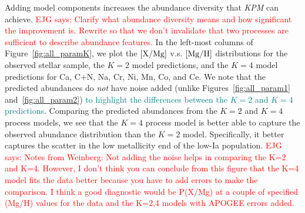 \documentclass[modern]{aastex631}
\newcommand{\xmg}{[{\rm X}/{\rm Mg}]}
\newcommand{\mgh}{[{\rm Mg}/{\rm H}]}
\newcommand{\ejg}[1]{\textcolor{red}{EJG says: #1}}
\newcommand{\add}[1]{\textcolor{teal}{#1}}
\newcommand{\name}{\textsl{KPM}}
\begin{document}
Adding model components increases the abundance diversity that \name{} can achieve. \ejg{Clarify what abundance diversity means and how significant the improvement is. Rewrite so that we don't invalidate that two processes are sufficient to describe abundance features.} In the left-most columns of Figure~\ref{fig:all_paramK}, we plot the $\xmg$ v.s. $\mgh$ distributions for the observed stellar sample, the $K=2$ model predictions, and the $K=4$ model predictions for Ca, C+N, Na, Cr, Ni, Mn, Co, and Ce. We note that the predicted abundances do \textit{not} have noise added (unlike Figures~\ref{fig:all_param1} and~\ref{fig:all_param2}) \add{to highlight the differences between the $K=2$ and $K=4$ predictions}. Comparing the predicted abundances from the $K=2$ and $K=4$ process models, we see that the $K=4$ process model is better able to capture the observed abundance distribution than the $K=2$ model. Specifically, it better captures the scatter in the low metallicity end of the low-Ia population. \ejg{Notes from Weinberg: Not adding the noise helps in comparing the K=2 and K=4. However, I don't think you can conclude from this figure that the K=4 model fits the data better because you have to add errors to make the comparison. I think a good diagnostic would be P(X/Mg) at a couple of specified (Mg/H) values for the data and the K=2,4 models with APOGEE errors added.}
\end{document}
